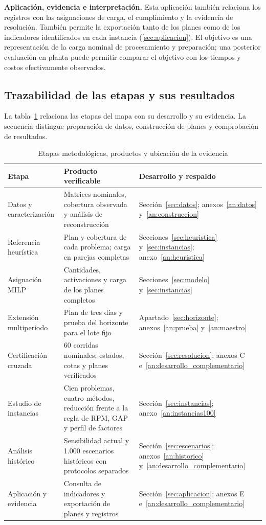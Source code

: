 \textbf{Aplicación, evidencia e interpretación.}
Esta aplicación también relaciona los registros con las asignaciones de carga, el cumplimiento y la evidencia de resolución. También permite la exportación tanto de los planes como de los indicadores identificados en cada instancia (\ref{sec:aplicacion}). El objetivo es una representación de la carga nominal de procesamiento y preparación; una posterior evaluación en planta puede permitir comparar el objetivo con los tiempos y costos efectivamente observados.


\clearpage
\subsection{Trazabilidad de las etapas y sus resultados}
La tabla~\ref{tab:trazabilidad_metodologica} relaciona las etapas del mapa con su desarrollo y su evidencia. La secuencia distingue preparación de datos, construcción de planes y comprobación de resultados.
\begin{table}[H]\centering\small
\caption{Etapas metodológicas, productos y ubicación de la evidencia}\label{tab:trazabilidad_metodologica}
\begin{tabular}{p{33mm}p{65mm}p{44mm}}\toprule
Etapa & Producto verificable & Desarrollo y respaldo\\\midrule
Datos y caracterización & Matrices nominales, cobertura observada y análisis de reconstrucción & Sección~\ref{sec:datos}; anexos~\ref{an:datos} y~\ref{an:construccion}\\[4pt]
Referencia heurística & Plan y cobertura de cada problema; carga en parejas completas & Secciones~\ref{sec:heuristica} y~\ref{sec:instancias}; anexo~\ref{an:heuristica}\\[4pt]
Asignación MILP & Cantidades, activaciones y carga de los planes completos & Secciones~\ref{sec:modelo} y~\ref{sec:instancias}\\[4pt]
Extensión multiperiodo & Plan de tres días y prueba del horizonte para el lote fijo & Apartado~\ref{sec:horizonte}; anexos~\ref{an:prueba} y~\ref{an:maestro}\\[4pt]
Certificación cruzada & 60 corridas nominales; estados, cotas y planes verificados & Sección~\ref{sec:resolucion}; anexos C e~\ref{an:desarrollo_complementario}\\[4pt]
Estudio de instancias & Cien problemas, cuatro métodos, reducción frente a la regla de RPM, GAP y perfil de factores & Sección~\ref{sec:instancias}; anexo~\ref{an:instancias100}\\[4pt]
Análisis histórico & Sensibilidad actual y 1.000 escenarios históricos con protocolos separados & Sección~\ref{sec:escenarios}; anexos~\ref{an:historico} y~\ref{an:desarrollo_complementario}\\[4pt]
Aplicación y evidencia & Consulta de indicadores y exportación de planes y registros & Sección~\ref{sec:aplicacion}; anexos E e~\ref{an:desarrollo_complementario}\\\bottomrule
\end{tabular}
\end{table}
